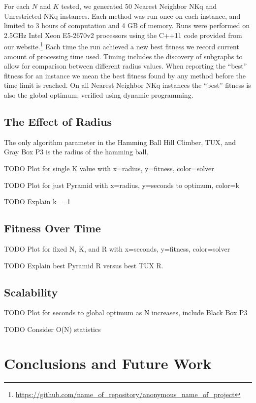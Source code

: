 \documentclass{sig-alternate}
\begin{document}
For each $N$ and $K$ tested, we generated 50 Nearest Neighbor NKq and Unrestricted NKq instances.
Each method was run once on each instance, and limited to 3 hours of computation and 4 GB of memory.
Runs were performed on 2.5GHz Intel Xeon E5-2670v2 processors using the C++11 code provided
from our website.\footnote{\url{https://github.com/name_of_repository/anonymous_name_of_project}}
Each time the run achieved a new best fitness we record current amount of processing time used.
Timing includes the discovery of subgraphs to allow for comparison between different radius values.
When reporting the ``best'' fitness for an instance we mean the best fitness found by any method before
the time limit is reached. On all Nearest Neighbor NKq instances the ``best'' fitness
is also the global optimum, verified using dynamic programming.


\subsection{The Effect of Radius}
The only algorithm parameter in the Hamming Ball Hill Climber, TUX, and Gray Box P3
is the radius of the hamming ball.

TODO Plot for single K value with x=radius, y=fitness, color=solver

TODO Plot for just Pyramid with x=radius, y=seconds to optimum, color=k

TODO Explain k==1

\subsection{Fitness Over Time}
TODO Plot for fixed N, K, and R with x=seconds, y=fitness, color=solver

TODO Explain best Pyramid R versus best TUX R.

\subsection{Scalability}
TODO Plot for seconds to global optimum as N increases, include Black Box P3

TODO Consider O(N) statistics

\section{Conclusions and Future Work}
%

%
%
\balancecolumns
\end{document}
